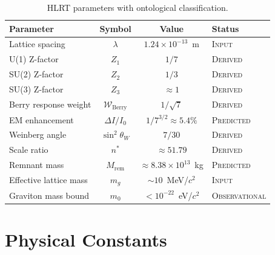 \documentclass[11pt,letterpaper]{article}
\begin{document}
\begin{table}[h]
\centering
\begin{tabular}{lccl}
\toprule
\textbf{Parameter} & \textbf{Symbol} & \textbf{Value} & \textbf{Status} \\
\midrule
Lattice spacing          & $\lambda$           & $1.24\times10^{-13}$~m  & \textsc{Input} \\
U(1) Z-factor            & $Z_1$               & $1/7$                    & \textsc{Derived} \\
SU(2) Z-factor           & $Z_2$               & $1/3$                    & \textsc{Derived} \\
SU(3) Z-factor           & $Z_3$               & $\approx1$               & \textsc{Derived} \\
Berry response weight     & $\mathcal{W}_\mathrm{Berry}$ & $1/\sqrt{7}$  & \textsc{Derived} \\
EM enhancement           & $\Delta I/I_0$       & $1/7^{3/2}\approx5.4\%$ & \textsc{Predicted} \\
Weinberg angle           & $\sin^2\!\theta_W$   & $7/30$                   & \textsc{Derived} \\
Scale ratio              & $n^*$               & $\approx51.79$            & \textsc{Derived} \\
Remnant mass             & $M_\mathrm{rem}$     & $\approx8.38\times10^{13}$~kg & \textsc{Predicted} \\
Effective lattice mass   & $m_g$               & $\sim10$~MeV/$c^2$       & \textsc{Input} \\
Graviton mass bound      & $m_0$               & $<10^{-22}$~eV/$c^2$    & \textsc{Observational} \\
\bottomrule
\end{tabular}
\caption{HLRT parameters with ontological classification.}
\end{table}

\section{Physical Constants}
\end{document}
